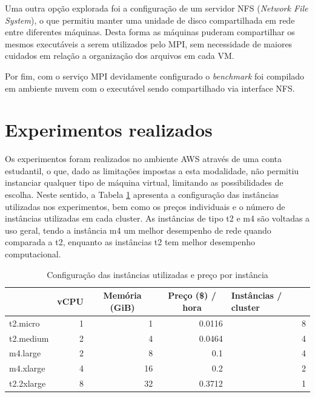 \documentclass[a4paper,11pt]{article}
\begin{document}
Uma outra opção explorada foi a configuração de um servidor NFS (\textit{Network File System}), o que permitiu manter uma unidade de disco compartilhada em rede entre diferentes máquinas. Desta forma as máquinas puderam compartilhar os mesmos executáveis a serem utilizados pelo MPI, sem necessidade de maiores cuidados em relação a organização dos arquivos em cada VM.


Por fim, com o serviço MPI devidamente configurado o \textit{benchmark} foi compilado em ambiente nuvem com o executável sendo compartilhado via interface NFS.

\vspace{0.3cm}

\section{Experimentos realizados}

\vspace{0.3cm}

Os experimentos foram realizados no ambiente AWS através de uma conta estudantil, o que, dado as limitações impostas a esta modalidade, não permitiu instanciar qualquer tipo de  máquina virtual, limitando as possibilidades de escolha. Neste sentido, a Tabela \ref{tab:inst} apresenta a configuração das instâncias utilizadas nos experimentos, bem como os preços individuais e o número de instâncias utilizadas em cada cluster. As instâncias de tipo t2 e m4 são voltadas a uso geral, tendo a instância m4 um melhor desempenho de rede quando comparada a t2, enquanto as instâncias t2 tem melhor desempenho computacional.




\begin{table}[htbp]
\center
\caption{Configuração das instâncias utilizadas e preço por instância}
\begin{tabular}{|l|r|r|r|r|}
\hline
 & \multicolumn{1}{c|}{\textbf{vCPU}} & \multicolumn{1}{c|}{\textbf{Memória (GiB)}} & \multicolumn{1}{c|}{\textbf{Preço (\$) / hora}} & \multicolumn{1}{l|}{\textbf{Instâncias / cluster}} \\ \hline
t2.micro & 1 & 1 & 0.0116 & 8 \\ \hline
t2.medium & 2 & 4 & 0.0464 & 4 \\ \hline
m4.large & 2 & 8 & 0.1 & 4 \\ \hline
m4.xlarge & 4 & 16 & 0.2 & 2 \\ \hline
t2.2xlarge & 8 & 32 & 0.3712 & 1 \\ \hline
\end{tabular}
\label{tab:inst}
\end{table}
\end{document}
